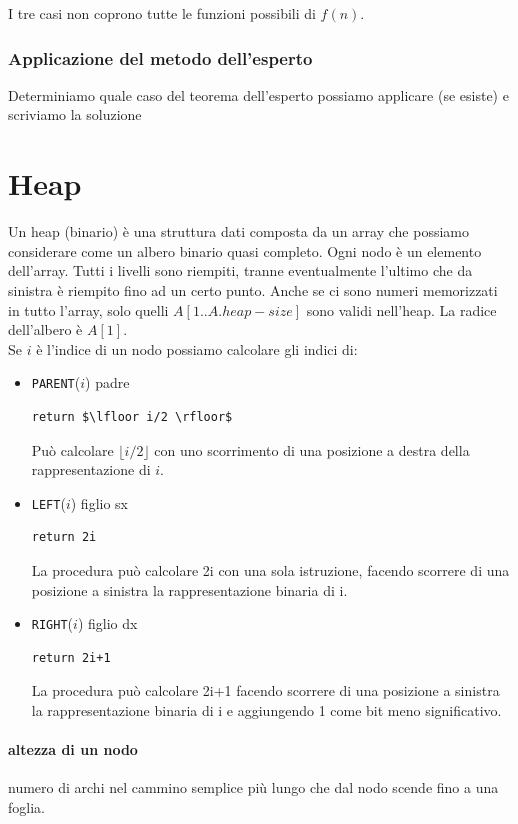 \documentclass[11pt,a4paper]{article}
\begin{document}
I tre casi non coprono tutte le funzioni possibili di $f(n)$.

\subsubsection{Applicazione del metodo dell’esperto}
Determiniamo quale caso del teorema dell’esperto possiamo applicare (se esiste) e scriviamo la soluzione

\section{Heap}
Un heap (binario) è una struttura dati composta da un array che possiamo considerare come un albero binario
quasi completo. Ogni nodo è un elemento dell’array. Tutti i livelli sono riempiti, tranne eventualmente l’ultimo
che da sinistra è riempito fino ad un certo punto.
Anche se ci sono numeri memorizzati in tutto l’array, solo quelli $A[1 .. A.heap-size]$ sono validi nell’heap. La
radice dell’albero è $A[1]$.\medskip\\
%
Se $i$ è l’indice di un nodo possiamo calcolare gli indici di:
\begin{itemize}[leftmargin=*]
\item \texttt{PARENT}($i$) padre
\begin{lstlisting}[mathescape=true]
return $\lfloor i/2 \rfloor$
\end{lstlisting}
Può calcolare $\lfloor i/2 \rfloor$ con uno scorrimento di una posizione a destra della rappresentazione di $i$.
\item \texttt{LEFT}($i$) figlio sx
\begin{lstlisting}[mathescape=true]
return 2i
\end{lstlisting}
La procedura può calcolare 2i con una sola istruzione, facendo scorrere di una
posizione a sinistra la rappresentazione binaria di i.
\item \texttt{RIGHT}($i$) figlio dx
\begin{lstlisting}[mathescape=true]
return 2i+1
\end{lstlisting}
La procedura può calcolare 2i+1 facendo scorrere di una posizione a sinistra la
rappresentazione binaria di i e aggiungendo 1 come bit meno significativo.
\end{itemize}

\paragraph{altezza di un nodo} numero di archi nel cammino semplice più lungo che dal nodo scende fino a una foglia.
\end{document}
